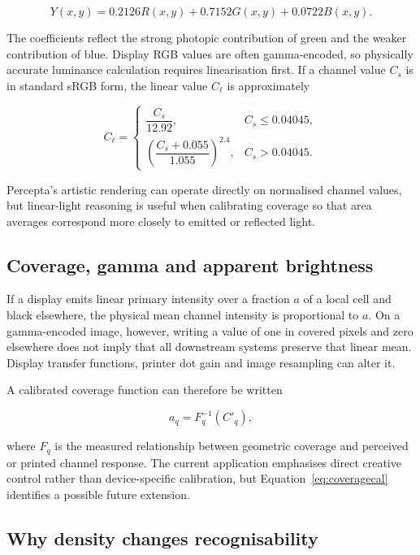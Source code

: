 \begin{equation}
Y(x,y)=0.2126R(x,y)+0.7152G(x,y)+0.0722B(x,y).
\label{eq:luminance}
\end{equation}

The coefficients reflect the strong photopic contribution of green and the weaker contribution of blue. Display RGB values are often gamma-encoded, so physically accurate luminance calculation requires linearisation first. If a channel value $C_s$ is in standard sRGB form, the linear value $C_\ell$ is approximately

\begin{equation}
C_\ell=
\begin{cases}
\dfrac{C_s}{12.92},&C_s\le0.04045,\\[3mm]
\left(\dfrac{C_s+0.055}{1.055}\right)^{2.4},&C_s>0.04045.
\end{cases}
\label{eq:srgblinear}
\end{equation}

Percepta's artistic rendering can operate directly on normalised channel values, but linear-light reasoning is useful when calibrating coverage so that area averages correspond more closely to emitted or reflected light.

\subsection{Coverage, gamma and apparent brightness}

If a display emits linear primary intensity over a fraction $a$ of a local cell and black elsewhere, the physical mean channel intensity is proportional to $a$. On a gamma-encoded image, however, writing a value of one in covered pixels and zero elsewhere does not imply that all downstream systems preserve that linear mean. Display transfer functions, printer dot gain and image resampling can alter it.

A calibrated coverage function can therefore be written

\begin{equation}
a_q=F_q^{-1}(C'_q),
\label{eq:coveragecal}
\end{equation}

where $F_q$ is the measured relationship between geometric coverage and perceived or printed channel response. The current application emphasises direct creative control rather than device-specific calibration, but Equation~\eqref{eq:coveragecal} identifies a possible future extension.

\subsection{Why density changes recognisability}

